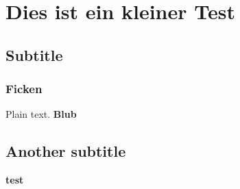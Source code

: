 \documentclass{article}
\begin{document}
\section{Dies ist ein kleiner Test}

\subsection{Subtitle}

\subsubsection{Ficken}
Plain text.
\textbf{Blub}



\subsection{Another subtitle}

\textbf{test}
\end{document}

